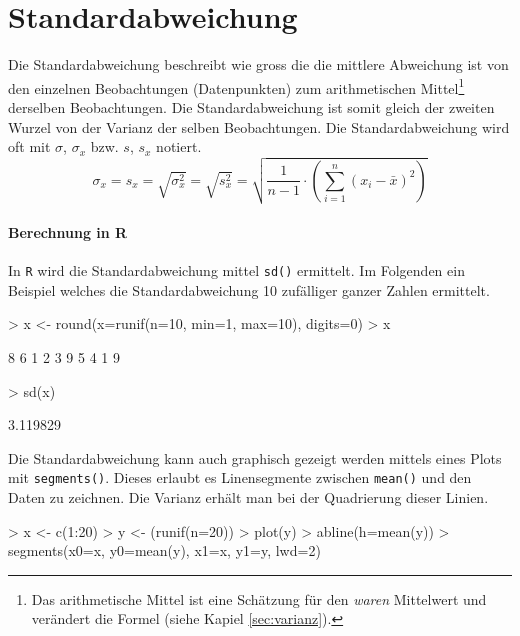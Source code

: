 \section{Standardabweichung}
Die \gls{Standardabweichung} beschreibt wie gross die die mittlere 
Abweichung ist von den einzelnen Beobachtungen (Datenpunkten) zum 
arithmetischen Mittel\footnote{Das arithmetische Mittel ist eine 
Schätzung für den
\emph{waren} Mittelwert und verändert die Formel 
(siehe Kapiel \ref{sec:varianz}).} 
derselben Beobachtungen. Die Standardabweichung ist somit gleich
der zweiten Wurzel von der Varianz der selben Beobachtungen. Die
Standardabweichung wird oft mit $\sigma$, $\sigma_x$ bzw. $s$, $s_x$ 
notiert.
\[
	\sigma_x 
	= s_x 
	= \sqrt{\sigma_{x}^2}
	= \sqrt{s_{x}^2}
	= \sqrt{\frac{1}{n-1} \cdot \left(
		\sum_{i=1}^n (x_i-\bar{x})^2 
	\right)}
\]

\paragraph{Berechnung in R}
In \lstinline{R} wird die Standardabweichung mittel \lstinline{sd()}
ermittelt. Im Folgenden ein Beispiel welches die Standardabweichung
10 zufälliger ganzer Zahlen ermittelt.
\begin{Schunk}
\begin{Sinput}
> x <- round(x=runif(n=10, min=1, max=10), digits=0)
> x
\end{Sinput}
\begin{Soutput}
 [1] 8 6 1 2 3 9 5 4 1 9
\end{Soutput}
\begin{Sinput}
> sd(x)
\end{Sinput}
\begin{Soutput}
[1] 3.119829
\end{Soutput}
\end{Schunk}
Die Standardabweichung kann auch graphisch gezeigt werden mittels
eines Plots mit \lstinline{segments()}. Dieses erlaubt es Linensegmente
zwischen \lstinline{mean()} und den Daten zu zeichnen. Die Varianz
erhält man bei der Quadrierung dieser Linien.
\begin{Schunk}
\begin{Sinput}
> x <- c(1:20)
> y <- (runif(n=20))
> plot(y)
> abline(h=mean(y))
> segments(x0=x, y0=mean(y), x1=x, y1=y, lwd=2)
\end{Sinput}
\end{Schunk}



